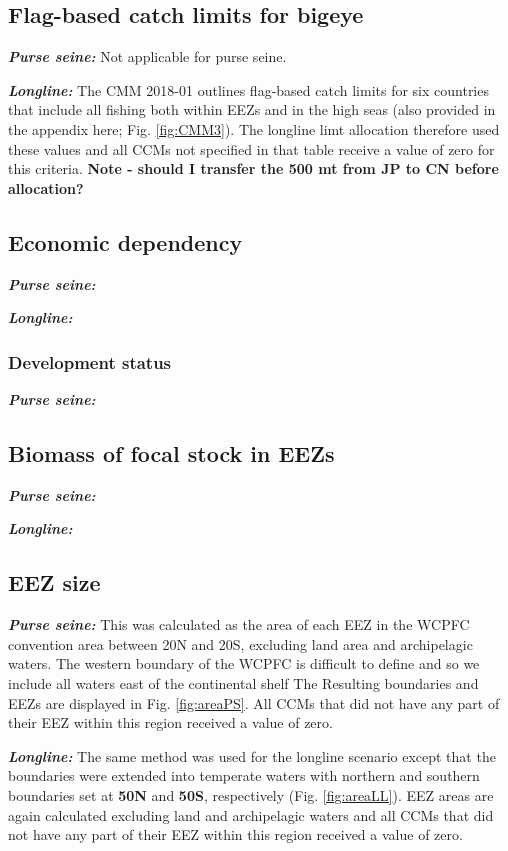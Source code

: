 \documentclass[11pt]{article}
\begin{document}
\subsection*{Flag-based catch limits for bigeye}
\noindent\textbf{\emph{Purse seine:}}
Not applicable for purse seine.

\noindent\textbf{\emph{Longline:}}
The CMM 2018-01 outlines flag-based catch limits for six countries that include all fishing both within EEZs and in the high seas (also provided in the appendix here; Fig. \ref{fig:CMM3}). The longline limt allocation therefore used these values and all CCMs not specified in that table receive a value of zero for this criteria. {\bf Note - should I transfer the 500 mt from JP to CN before allocation?}

\subsection*{Economic dependency}
\noindent\textbf{\emph{Purse seine:}}

\noindent\textbf{\emph{Longline:}}

\subsubsection*{Development status}
\noindent\textbf{\emph{Purse seine:}}

\subsection*{Biomass of focal stock in EEZs}
\noindent\textbf{\emph{Purse seine:}}

\noindent\textbf{\emph{Longline:}}

\subsection*{EEZ size}
\noindent\textbf{\emph{Purse seine:}}
This was calculated as the area of each EEZ in the WCPFC convention area between 20\degree N and 20\degree S, excluding land area and archipelagic waters. The western boundary of the WCPFC is difficult to define and so we include all waters east of the continental shelf The Resulting boundaries and EEZs are displayed in Fig. \ref{fig:areaPS}. All CCMs that did not have any part of their EEZ within this region received a value of zero.

\noindent\textbf{\emph{Longline:}}
The same method was used for the longline scenario except that the boundaries were extended into temperate waters with northern and southern boundaries set at {\bf 50\degree N} and {\bf 50\degree S}, respectively (Fig. \ref{fig:areaLL}). EEZ areas are again calculated excluding land and archipelagic waters and all CCMs that did not have any part of their EEZ within this region received a value of zero.
\end{document}
